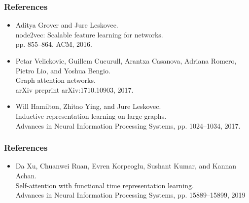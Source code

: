\documentclass[fleqn, xcolor=x11names]{beamer}
\begin{document}
\begin{frame}\frametitle{References}
\begin{itemize}
\item Aditya Grover and Jure Leskovec.\\
node2vec: Scalable feature learning for networks.\\
pp. 855–864. ACM, 2016.

\item Petar Velickovic, Guillem Cucurull, Arantxa Casanova, Adriana Romero, Pietro Lio, and Yoshua Bengio.\\
Graph attention networks.\\
arXiv preprint arXiv:1710.10903, 2017.

\item Will Hamilton, Zhitao Ying, and Jure Leskovec.\\
Inductive representation learning on large graphs.\\
Advances in Neural Information Processing Systems,
pp. 1024–1034, 2017.


\end{itemize}
\end{frame}

\begin{frame}\frametitle{References}
\begin{itemize}
\item Da Xu, Chuanwei Ruan, Evren Korpeoglu, Sushant Kumar, and Kannan Achan.\\
Self-attention with functional time representation learning.\\
Advances in Neural Information Processing Systems,
pp. 15889–15899, 2019
\end{itemize}
\end{frame}
\end{document}
